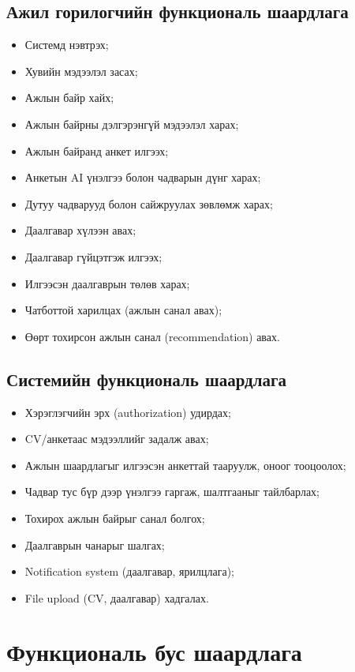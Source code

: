 \subsection*{Ажил горилогчийн функциональ шаардлага}
\begin{itemize}
\item Системд нэвтрэх;
\item Хувийн мэдээлэл засах;
\item Ажлын байр хайх;
\item Ажлын байрны дэлгэрэнгүй мэдээлэл харах;
\item Ажлын байранд анкет илгээх;
\item Анкетын AI үнэлгээ болон чадварын дүнг харах;
\item Дутуу чадварууд болон сайжруулах зөвлөмж харах;
\item Даалгавар хүлээн авах;
\item Даалгавар гүйцэтгэж илгээх;
\item Илгээсэн даалгаврын төлөв харах;
\item Чатботтой харилцах (ажлын санал авах);
\item Өөрт тохирсон ажлын санал (recommendation) авах.
\end{itemize}
\subsection*{Системийн функциональ шаардлага}
\begin{itemize}
\item Хэрэглэгчийн эрх (authorization) удирдах;
\item CV/анкетаас мэдээллийг задалж авах;
\item Ажлын шаардлагыг илгээсэн анкеттай тааруулж, оноог тооцоолох;
\item Чадвар тус бүр дээр үнэлгээ гаргаж, шалтгааныг тайлбарлах;
\item Тохирох ажлын байрыг санал болгох;
\item Даалгаврын чанарыг шалгах;
\item Notification system (даалгавар, ярилцлага);
\item File upload (CV, даалгавар) хадгалах.
\end{itemize}
\section{Функциональ бус шаардлага} %

